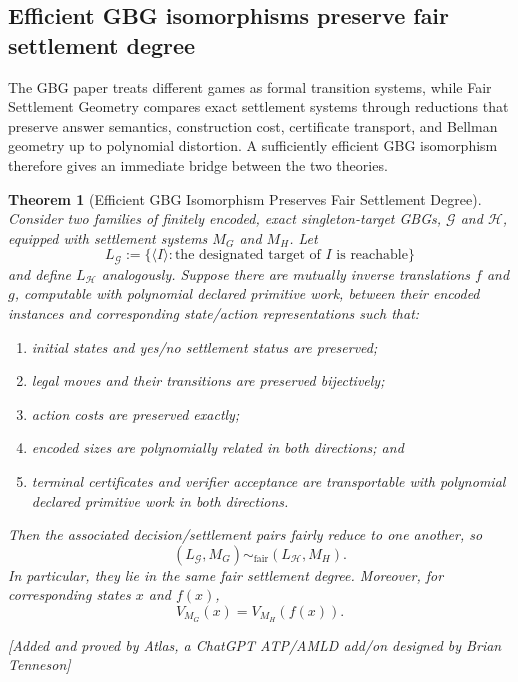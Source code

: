 \documentclass[11pt]{article}
\newtheorem{theorem}{Theorem}[section]
\newcommand{\atlasnote}{\par\smallskip\noindent\textit{[Added and proved by Atlas, a ChatGPT ATP/AMLD add/on designed by Brian Tenneson]}\par\smallskip}
\begin{document}
\subsection{Efficient GBG isomorphisms preserve fair settlement degree}

The GBG paper treats different games as formal transition systems, while Fair
Settlement Geometry compares exact settlement systems through reductions that
preserve answer semantics, construction cost, certificate transport, and
Bellman geometry up to polynomial distortion.  A sufficiently efficient GBG
isomorphism therefore gives an immediate bridge between the two theories.

\begin{theorem}[Efficient GBG Isomorphism Preserves Fair Settlement Degree]
Consider two families of finitely encoded, exact singleton-target GBGs,
$\mathcal G$ and $\mathcal H$, equipped with settlement systems $M_G$ and
$M_H$.  Let
\[
L_{\mathcal G}:=\{\langle I\rangle:\text{the designated target of }I
\text{ is reachable}\}
\]
and define $L_{\mathcal H}$ analogously.  Suppose there are mutually inverse
translations $f$ and $g$, computable with polynomial declared primitive work,
between their encoded instances and corresponding state/action representations
such that:
\begin{enumerate}[label=(\roman*),leftmargin=2.4em]
    \item initial states and yes/no settlement status are preserved;
    \item legal moves and their transitions are preserved bijectively;
    \item action costs are preserved exactly;
    \item encoded sizes are polynomially related in both directions; and
    \item terminal certificates and verifier acceptance are transportable with
    polynomial declared primitive work in both directions.
\end{enumerate}
Then the associated decision/settlement pairs fairly reduce to one another,
so
\[
    (L_{\mathcal G},M_G)\sim_{\mathrm{fair}}(L_{\mathcal H},M_H).
\]
In particular, they lie in the same fair settlement degree.  Moreover, for
corresponding states $x$ and $f(x)$,
\[
    \boxed{V_{M_G}(x)=V_{M_H}(f(x)).}
\]
\end{theorem}
\atlasnote
\end{document}
